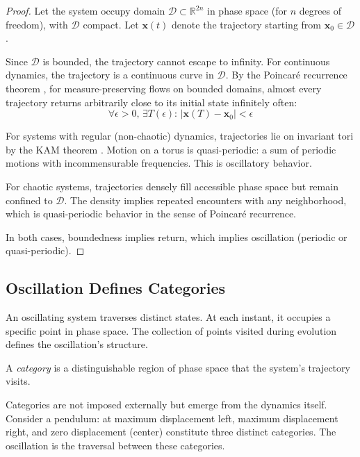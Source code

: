 \begin{proof}
Let the system occupy domain $\mathcal{D} \subset \mathbb{R}^{2n}$ in phase space (for $n$ degrees of freedom), with $\mathcal{D}$ compact. Let $\mathbf{x}(t)$ denote the trajectory starting from $\mathbf{x}_0 \in \mathcal{D}$.

Since $\mathcal{D}$ is bounded, the trajectory cannot escape to infinity. For continuous dynamics, the trajectory is a continuous curve in $\mathcal{D}$. By the Poincaré recurrence theorem \citep{poincare1890probleme}, for measure-preserving flows on bounded domains, almost every trajectory returns arbitrarily close to its initial state infinitely often:
\begin{equation}
\forall \epsilon > 0, \, \exists T(\epsilon) : \, |\mathbf{x}(T) - \mathbf{x}_0| < \epsilon
\end{equation}

For systems with regular (non-chaotic) dynamics, trajectories lie on invariant tori by the KAM theorem \citep{kolmogorov1954conservation,arnold1963small,moser1962invariant}. Motion on a torus is quasi-periodic: a sum of periodic motions with incommensurable frequencies. This is oscillatory behavior.

For chaotic systems, trajectories densely fill accessible phase space but remain confined to $\mathcal{D}$. The density implies repeated encounters with any neighborhood, which is quasi-periodic behavior in the sense of Poincaré recurrence.

In both cases, boundedness implies return, which implies oscillation (periodic or quasi-periodic).
\end{proof}

\subsection{Oscillation Defines Categories}

An oscillating system traverses distinct states. At each instant, it occupies a specific point in phase space. The collection of points visited during evolution defines the oscillation's structure.

\begin{definition}[Category]
\label{def:category}
A \textit{category} is a distinguishable region of phase space that the system's trajectory visits.
\end{definition}

Categories are not imposed externally but emerge from the dynamics itself. Consider a pendulum: at maximum displacement left, maximum displacement right, and zero displacement (center) constitute three distinct categories. The oscillation is the traversal between these categories.

